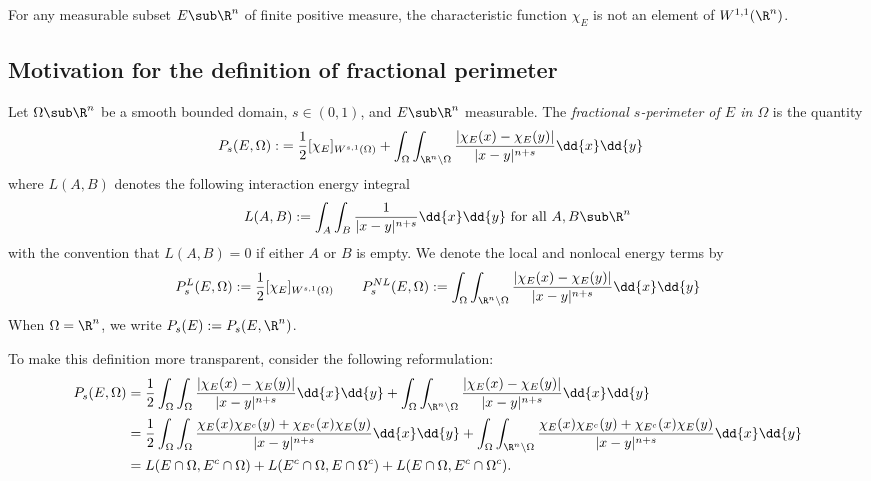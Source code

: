 \documentclass[../main.tex]{subfiles}
\begin{document}
\begin{fact}
    For any measurable subset $ E\sub \R^{n} $ of finite positive measure, the characteristic function $ \chi_{E} $ is not an element of $ W^{1,1}(\R^{n})$.
\end{fact}









\subsection{Motivation for the definition of fractional perimeter}


\begin{definition}\label{fracperim}
    Let $ \Omega\sub \R^{n} $ be a smooth bounded domain, $ s\in (0,1) $, and $ E\sub \R^{n} $ measurable. The \textit{fractional $ s $-perimeter of $ E $ in $ \Omega $} is the quantity
    \begin{align*}
        P_{s}(E, \Omega) :&= \frac{1}{2}[\chi_{E}]_{W^{s,1}(\Omega)} + \int_{\Omega}\int_{\R^{n}\setminus \Omega} \frac{| \chi_{E}(x) - \chi_{E}(y)|}{|x-y|^{n+s}}\dd{x}\dd{y} 
    \end{align*}
    where $ L(A,B) $ denotes the following interaction energy integral
    \[
        L(A,B) := \int_{A}\int_{B}\frac{1}{|x-y|^{n+s}}\dd{x}\dd{y} \text{ for all } A,B\sub \R^{n}
    \]
    with the convention that $ L(A,B) = 0 $ if either $ A $ or $ B $ is empty. We denote the local and nonlocal energy terms by
    \[
        P_{s}^{L}(E,\Omega) := \frac{1}{2}[\chi_{E}]_{W^{s,1}(\Omega)} \quad \quad P_{s}^{NL}(E,\Omega) := \int_{\Omega}\int_{\R^{n}\setminus \Omega} \frac{| \chi_{E}(x) - \chi_{E}(y)|}{|x-y|^{n+s}}\dd{x}\dd{y} 
    \]
    When $ \Omega =\R^{n} $, we write $ P_{s}(E):= P_{s}(E,\R^{n}) $.
\end{definition}

To make this definition more transparent, consider the following reformulation:
\begin{align*}
    P_{s}(E, \Omega) &= \frac{1}{2}\int_{\Omega}\int_{\Omega} \frac{|\chi_{E}(x)-\chi_{E}(y)|}{|x-y|^{n+s}}\dd{x}\dd{y} +  \int_{\Omega}\int_{\R^{n}\setminus \Omega} \frac{| \chi_{E}(x) - \chi_{E}(y)|}{|x-y|^{n+s}}\dd{x}\dd{y} \\
    &= \frac{1}{2}\int_{\Omega}\int_{\Omega} \frac{\chi_{E}(x) \chi_{E^{c}}(y) + \chi_{E^{c}}(x) \chi_{E}(y)}{|x-y|^{n+s}}\dd{x}\dd{y} +  \int_{\Omega}\int_{\R^{n}\setminus \Omega} \frac{\chi_{E}(x) \chi_{E^{c}}(y) + \chi_{E^{c}}(x) \chi_{E}(y)}{|x-y|^{n+s}}\dd{x}\dd{y}\\
    &= L(E\cap \Omega, E^{c} \cap \Omega) + L(E^{c}\cap \Omega, E\cap \Omega^{c}) + L(E\cap \Omega, E^{c}\cap \Omega^{c}).
\end{align*}
\end{document}
